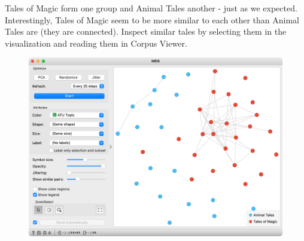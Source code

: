 Tales of Magic form one group and Animal Tales another - just as we expected. Interestingly, Tales of Magic seem to be more similar to each other than Animal Tales are (they are connected). Inspect similar tales by selecting them in the visualization and reading them in Corpus Viewer.

\vspace{-0.2cm}
\begin{figure}[h]
  \centering
  \includegraphics[width=0.9\linewidth]{mds.png}%
  \caption{}
\end{figure}
\vspace{-0.3cm}
